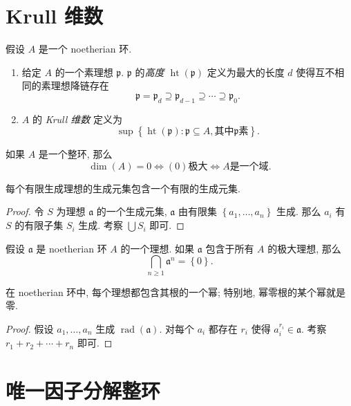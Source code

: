 \section{Krull 维数}

假设 \( A \) 是一个 noetherian 环.
\begin{enumerate}
  \item 给定 \( A \) 的一个素理想 \( \mathfrak{p} \). \( \mathfrak{p} \)
    的\emph{高度 \( \operatorname{ht}(\mathfrak{p}) \)} 定义为最大的长度 \( d \)
    使得互不相同的素理想降链存在
    \[
      \mathfrak{p} = \mathfrak{p}_d \supseteq \mathfrak{p}_{d - 1} \supseteq
      \cdots \supseteq \mathfrak{p}_0.
    \]
  \item \( A \) 的 \emph{Krull 维数} 定义为
    \[
      \sup \left\lbrace \operatorname{ht}(\mathfrak{p}): \mathfrak{p} \subseteq
      A, \text{其中} \mathfrak{p} \text{素} \right\rbrace.
    \]
\end{enumerate}

如果 \( A \) 是一个整环, 那么
\[
  \operatorname{dim} (A) = 0 \iff (0) \text{极大} \iff A \text{是一个域}.
\]
\begin{lemma}
  每个有限生成理想的生成元集包含一个有限的生成元集.
\end{lemma}
\begin{proof}
  令 \( S \) 为理想 \( \mathfrak{a} \) 的一个生成元集, \( \mathfrak{a} \)
  由有限集 \( \left\lbrace a_1, \ldots, a_n \right\rbrace \) 生成. 那么 \( a_i
  \) 有 \( S \) 的有限子集 \( S_i \) 生成. 考察 \( \bigcup S_i \) 即可.
\end{proof}

\begin{theorem}
  假设 \( \mathfrak{a} \) 是 noetherian 环 \( A \) 的一个理想. 如果 \(
  \mathfrak{a} \) 包含于所有 \( A \) 的极大理想, 那么
  \[
    \bigcap_{n \geq 1} \mathfrak{a}^n = \left\lbrace 0 \right\rbrace.
  \]
\end{theorem}

\begin{proposition}
  在 noetherian 环中, 每个理想都包含其根的一个幂; 特别地, 幂零根的某个幂就是零.
\end{proposition}
\begin{proof}
  假设 \( a_1, \ldots, a_n \) 生成 \( \operatorname{rad}(\mathfrak{a}) \).
  对每个 \( a_i \) 都存在 \( r_i \) 使得 \( a_i^{r_i} \in \mathfrak{a} \).
  考察 \( r_1 + r_2 + \cdots + r_n \) 即可.
\end{proof}

\section{唯一因子分解整环}


